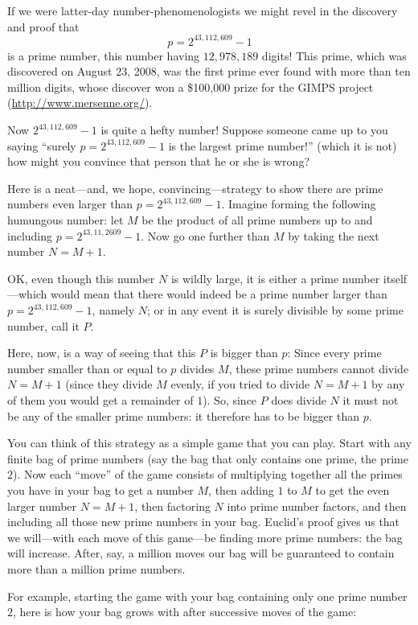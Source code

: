 \documentclass[11pt]{article}
\theoremstyle{plain}
\theoremstyle{definition}
\numberwithin{equation}{section}
\numberwithin{figure}{section}
\numberwithin{table}{section}
\begin{document}
If we were latter-day number-phenomenologists we might revel in the
discovery and proof that
$$
  p=2^{43,112,609}-1
$$ 
is a prime number, this number having $12,\!978,\!189$ digits!  This
prime, which was discovered on August 23, 2008, was the first prime
ever found with more than ten million digits, whose discover won a
\$100,000 prize for the GIMPS project (\url{http://www.mersenne.org/}).

Now $2^{43,112,609}-1$ is quite a hefty number! Suppose someone came
up to you saying ``surely $p = 2^{43,112,609}-1$ is the largest prime
number!'' (which it is not) how might you convince that person that
he or she is wrong?

Here is a neat---and, we hope, convincing---strategy to show there are
prime numbers even larger than $p = 2^{43,112,609} - 1$. Imagine
forming the following humungous number: let $M$ be the product of all
prime numbers up to and including $p = 2^{43,11,2609} - 1$.  Now go
one further than $M$ by taking the next number $N=M+1$.
 

OK, even though this number $N$ is wildly large, it is either a prime
number itself---which would mean that there would indeed be a prime
number larger than $p=2^{43,112,609} - 1$, namely $N$; or in any event it is
surely divisible by some prime number, call it $P$.

Here, now, is a way of seeing that this $P$ is bigger than $p$: Since
every prime number smaller than or equal to $p$ divides $M$, these
prime numbers cannot divide $N= M+1$ (since they divide $M$ evenly, if
you tried to divide $N=M+1$ by any of them you would get a remainder
of $1$).  So, since $P$ does divide $N$ it must not be any of the
smaller prime numbers: it therefore has to be bigger than $p$.

You can think of this strategy as a simple game that you can
play. Start with any finite bag of prime numbers (say the bag that
only contains one prime, the prime $2$). Now each ``move'' of the game
consists of multiplying together all the primes you have in your bag
to get a number $M$, then adding $1$ to $M$ to get the even larger
number $N=M+1$, then factoring $N$ into prime number factors, and then
including all those new prime numbers in your bag. Euclid's proof
gives us that we will---with each move of this game---be finding more
prime numbers: the bag will increase. After, say, a million moves our
bag will be guaranteed to contain more than a million prime numbers.

For example, starting the game with your bag containing
only one prime number $2$, here is how your bag grows with after
successive moves of the game:
\end{document}
